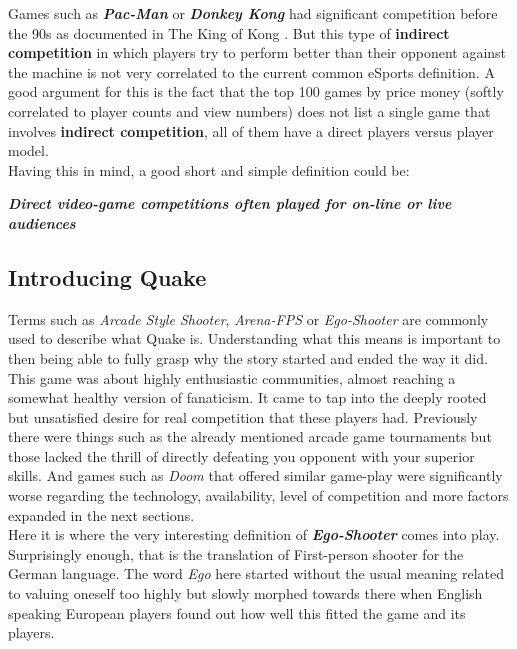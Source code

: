 Games such as \textbf{\textit{Pac-Man}} \citep{game:pacman} or \textbf{\textit{Donkey Kong}} \citep{game:donkeykong} had significant competition before the 90s as documented in The King of Kong \citep{kingKong}. But this type of \textbf{indirect competition} in which players try to perform better than their opponent against the machine is not very correlated to the current common eSports definition. A good argument for this is the fact that the top 100 games by price money (softly correlated to player counts and view numbers) does not list a single game that involves \textbf{indirect competition}, all of them have a direct players versus player model.\\

Having this in mind, a good short and simple definition could be:\\

\begin{center}
\textbf{\textit{Direct video-game competitions often played for on-line or live audiences}}
\end{center}

\subsection{Introducing Quake}

Terms such as \textit{Arcade Style Shooter}, \textit{Arena-FPS} or \textit{Ego-Shooter} are commonly used to describe what Quake is. Understanding what this means is important to then being able to fully grasp why the story started and ended the way it did.\\

This game was about highly enthusiastic communities, almost reaching a somewhat healthy version of fanaticism. It came to tap into the deeply rooted but unsatisfied desire for real competition that these players had. Previously there were things such as the already mentioned arcade game tournaments but those lacked the thrill of directly defeating you opponent with your superior skills. And games such as \textit{Doom} \citep{game:doom} that offered similar game-play were significantly worse regarding the technology, availability, level of competition and more factors expanded in the next sections.\\

Here it is where the very interesting definition of \textbf{\textit{Ego-Shooter}} comes into play. Surprisingly enough, that is the translation of First-person shooter for the German language. The word \textit{Ego} here started without the usual meaning related to valuing oneself too highly but slowly morphed towards there when English speaking European players found out how well this fitted the game and its players.\\


